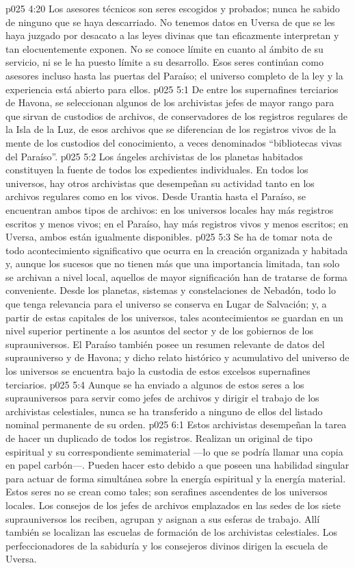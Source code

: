 \vs p025 4:20 Los asesores técnicos son seres escogidos y probados; nunca he sabido de ninguno que se haya descarriado. No tenemos datos en Uversa de que se les haya juzgado por desacato a las leyes divinas que tan eficazmente interpretan y tan elocuentemente exponen. No se conoce límite en cuanto al ámbito de su servicio, ni se le ha puesto límite a su desarrollo. Esos seres continúan como asesores incluso hasta las puertas del Paraíso; el universo completo de la ley y la experiencia está abierto para ellos.
\vs p025 5:1 De entre los supernafines terciarios de Havona, se seleccionan algunos de los archivistas jefes de mayor rango para que sirvan de custodios de archivos, de conservadores de los registros regulares de la Isla de la Luz, de esos archivos que se diferencian de los registros vivos de la mente de los custodios del conocimiento, a veces denominados “bibliotecas vivas del Paraíso”.
\vs p025 5:2 Los ángeles archivistas de los planetas habitados constituyen la fuente de todos los expedientes individuales. En todos los universos, hay otros archivistas que desempeñan su actividad tanto en los archivos regulares como en los vivos. Desde Urantia hasta el Paraíso, se encuentran ambos tipos de archivos: en los universos locales hay más registros escritos y menos vivos; en el Paraíso, hay más registros vivos y menos escritos; en Uversa, ambos están igualmente disponibles.
\vs p025 5:3 Se ha de tomar nota de todo acontecimiento significativo que ocurra en la creación organizada y habitada y, aunque los sucesos que no tienen más que una importancia limitada, tan solo se archivan a nivel local, aquellos de mayor significación han de tratarse de forma conveniente. Desde los planetas, sistemas y constelaciones de Nebadón, todo lo que tenga relevancia para el universo se conserva en Lugar de Salvación; y, a partir de estas capitales de los universos, tales acontecimientos se guardan en un nivel superior pertinente a los asuntos del sector y de los gobiernos de los suprauniversos. El Paraíso también posee un resumen relevante de datos del suprauniverso y de Havona; y dicho relato histórico y acumulativo del universo de los universos se encuentra bajo la custodia de estos excelsos supernafines terciarios.
\vs p025 5:4 Aunque se ha enviado a algunos de estos seres a los suprauniversos para servir como jefes de archivos y dirigir el trabajo de los archivistas celestiales, nunca se ha transferido a ninguno de ellos del listado nominal permanente de su orden.
\vs p025 6:1 Estos archivistas desempeñan la tarea de hacer un duplicado de todos los registros. Realizan un original de tipo espiritual y su correspondiente semimaterial ---lo que se podría llamar una copia en papel carbón---. Pueden hacer esto debido a que poseen una habilidad singular para actuar de forma simultánea sobre la energía espiritual y la energía material. Estos seres no se crean como tales; son serafines ascendentes de los universos locales. Los consejos de los jefes de archivos emplazados en las sedes de los siete suprauniversos los reciben, agrupan y asignan a sus esferas de trabajo. Allí también se localizan las escuelas de formación de los archivistas celestiales. Los perfeccionadores de la sabiduría y los consejeros divinos dirigen la escuela de Uversa.
